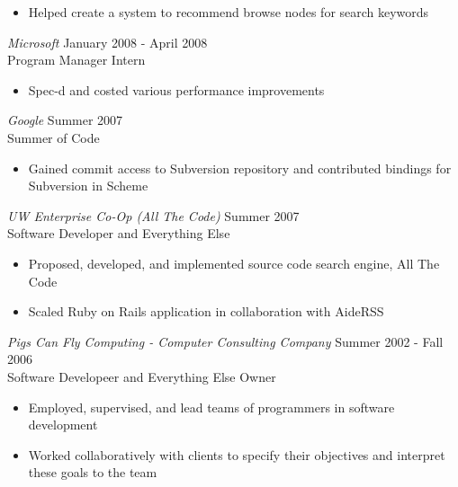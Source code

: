 \documentclass[10pt,line,margin=0.1]{newsres}
\begin{document}
\begin{resume}
\begin{itemize}
        \item Helped create a system to recommend browse nodes for search keywords
        \end{itemize} 
        {\sl Microsoft} \hfill        January 2008 - April 2008 \\
        Program Manager Intern
        \begin{itemize}
        \item Spec-d and costed various performance improvements
        \end{itemize} 
        {\sl Google} \hfill        Summer 2007 \\
        Summer of Code
        \begin{itemize}
        \item Gained commit access to Subversion repository and contributed bindings for Subversion in Scheme
        \end{itemize} 
        {\sl UW Enterprise Co-Op (All The Code)} \hfill Summer 2007 \\
        Software Developer and Everything Else
        \begin{itemize}  \itemsep -2pt %
        \item{Proposed, developed, and implemented source code search engine, All The Code}
        \item{Scaled Ruby on Rails application in collaboration with AideRSS}
        \end{itemize}
        {\sl Pigs Can Fly Computing - Computer Consulting Company} \hfill Summer 2002 - Fall 2006 \\
        Software Developeer and Everything Else Owner
        \begin{itemize}  \itemsep -2pt %
        \item{Employed, supervised, and lead teams of programmers in software development}
        \item{Worked collaboratively with clients to specify their objectives and interpret these goals to the team}
        \end{itemize}


\end{resume}
\end{document}
